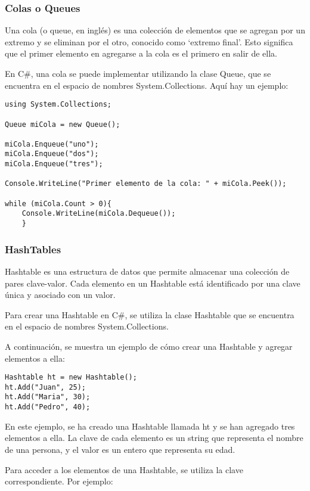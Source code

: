 \documentclass[executivepaper]{article}
\begin{document}
\subsubsection*{Colas o Queues}
Una cola (o queue, en inglés) es una colección de elementos que se agregan por un extremo y se eliminan por el otro, conocido como \enquote*{extremo final}. Esto significa que el primer elemento en agregarse a la cola es el primero en salir de ella.

En C\#, una cola se puede implementar utilizando la clase Queue, que se encuentra en el espacio de nombres System.Collections. Aquí hay un ejemplo:

\begin{lstlisting}
using System.Collections;

Queue miCola = new Queue();

miCola.Enqueue("uno");
miCola.Enqueue("dos");
miCola.Enqueue("tres");

Console.WriteLine("Primer elemento de la cola: " + miCola.Peek());

while (miCola.Count > 0){
    Console.WriteLine(miCola.Dequeue());
    }
\end{lstlisting}

\subsubsection*{HashTables}

Hashtable es una estructura de datos que permite almacenar una colección de pares clave-valor. Cada elemento en un Hashtable está identificado por una clave única y asociado con un valor.

Para crear una Hashtable en C\#, se utiliza la clase Hashtable que se encuentra en el espacio de nombres System.Collections.

A continuación, se muestra un ejemplo de cómo crear una Hashtable y agregar elementos a ella:

\begin{lstlisting}
Hashtable ht = new Hashtable();
ht.Add("Juan", 25);
ht.Add("Maria", 30);
ht.Add("Pedro", 40);
\end{lstlisting}

En este ejemplo, se ha creado una Hashtable llamada ht y se han agregado tres elementos a ella. La clave de cada elemento es un string que representa el nombre de una persona, y el valor es un entero que representa su edad.

Para acceder a los elementos de una Hashtable, se utiliza la clave correspondiente. Por ejemplo:
\end{document}

